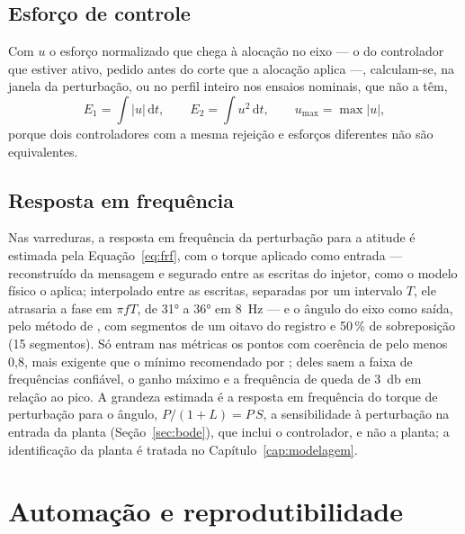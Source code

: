 \subsection{Esforço de controle}

Com $u$ o esforço normalizado que chega à
alocação no eixo --- o do controlador que estiver ativo, pedido antes do corte
que a alocação aplica ---, calculam-se, na janela da perturbação, ou no perfil
inteiro nos ensaios nominais, que não a têm,
\begin{equation}
E_1 = \int |u|\,\mathrm{d}t, \qquad
E_2 = \int u^2\,\mathrm{d}t, \qquad
u_{\max} = \max|u|,
\label{eq:esforco}
\end{equation}
porque dois controladores com a mesma rejeição e esforços diferentes não são
equivalentes.

\subsection{Resposta em frequência}

Nas varreduras, a resposta em frequência
da perturbação para a atitude é estimada pela Equação~\eqref{eq:frf}, com o
torque aplicado como entrada --- reconstruído da mensagem  e
segurado entre as escritas do injetor, como o modelo físico o aplica;
interpolado entre as escritas, separadas por um intervalo $T$, ele atrasaria
a fase em $\pi f T$, de \ang{31} a \ang{36} em \SI{8}{\hertz} --- e o ângulo do
eixo como saída, pelo método de , com segmentos de um
oitavo do registro e 50\,\% de sobreposição (15 segmentos). Só entram nas
métricas os pontos com coerência de pelo menos 0,8, mais exigente que o
mínimo recomendado por ; deles saem a faixa de
frequências confiável, o ganho máximo e a frequência de queda de
\SI{3}{\decibel} em relação ao pico. A grandeza estimada é a resposta em
frequência do torque de perturbação para o ângulo, $P/(1+L) = P\,S$, a
sensibilidade à perturbação na entrada da planta (Seção~\ref{sec:bode}), que
inclui o controlador, e não a planta; a identificação da planta é tratada no
Capítulo~\ref{cap:modelagem}.

\section{Automação e reprodutibilidade}
\label{sec:automacao}

